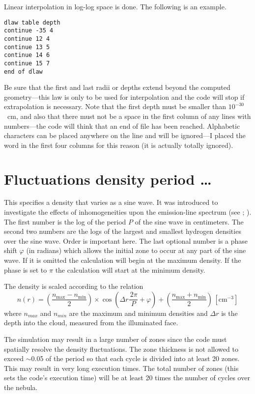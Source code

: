 Linear interpolation in log-log space is done.
The following is an example.
\begin{verbatim}
dlaw table depth
continue -35 4
continue 12 4
continue 13 5
continue 14 6
continue 15 7
end of dlaw
\end{verbatim}

Be sure that the first and last radii or depths extend beyond the computed
geometry---this law is only to be used for interpolation and the code will
stop if extrapolation is necessary.
Note that the first depth must be
smaller than $10^{-30}$~cm,
and also that there must not be a space in the first
column of any lines with numbers---the code will think that an end of file
has been reached.
Alphabetic characters can be placed anywhere on the line
and will be ignored---I placed the word
 in the first four columns
for this reason (it is actually totally ignored).

\section{Fluctuations density period \dots}
\label{sec:FluctuationsDensityCommand}

This specifies a density that varies as a sine wave.  It was introduced
to investigate the effects of inhomogeneities upon the
emission-line spectrum
(see \citealp{Mihalszki1983}; \citealp{KingdonFerland1995}).
The first number
is the log of the period $P$ of the sine wave in centimeters.
The second
two numbers are the logs of the largest and smallest hydrogen densities
over the sine wave.  Order is important here.
The last optional number
is a phase shift $\varphi$ (in radians) which allows the initial zone to occur at
any part of the sine wave.
If it is omitted the calculation will begin
at the maximum density.
If the phase is set to $\pi$ the calculation will start
at the minimum density.

The density is scaled according to the relation
\begin{equation}
\label{eqn:commandFluctuations}
n\left( r \right) = \left( {\frac{{n_{\max }  - n_{\min } }}{2}} \right)
\times \cos \left( {\Delta r\frac{{\,2\pi }}{P} + \varphi } \right) + \left(
{\frac{{n_{\max }  + n_{\min } }}{2}} \right)\, [\mathrm{cm}^{-3}]%
\end{equation}
where $n_{max}$ and $n_{min}$ are the maximum and minimum densities and
$\Delta r$ is the
depth into the cloud, measured from the illuminated face.

The simulation may result in a large number of zones since the code must
spatially resolve the density fluctuations.
The zone thickness is not
allowed to exceed ${\sim}$0.05 of the period so that each cycle is
divided into at least 20 zones.
This may result in very long execution times.
The total number of zones (this sets the code's execution time)
will be at least 20
times the number of cycles over the nebula.

